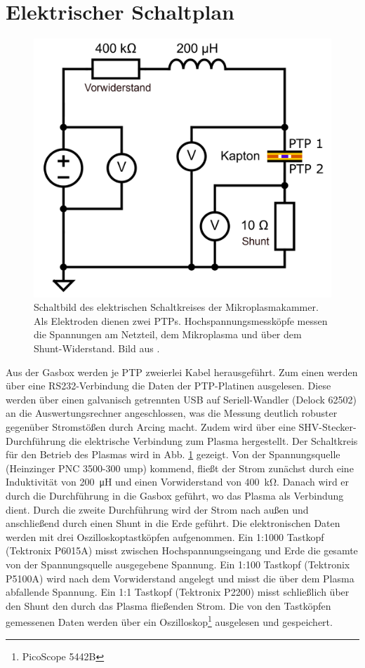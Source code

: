\section{Elektrischer Schaltplan}

\begin{figure}[h]
	\centering
	\includegraphics[width=0.5\linewidth]{bilder/schaltbild_beschriftet.png}
	\caption{Schaltbild des elektrischen Schaltkreises der Mikroplasmakammer. Als Elektroden dienen zwei PTPs. Hochspannungsmessköpfe messen die Spannungen am Netzteil, dem Mikroplasma und über dem Shunt-Widerstand. Bild aus \cite{hansenConventionalNonconventionalDiagnostics2022}.}
	\label{fig:schaltbild}
\end{figure}


Aus der Gasbox werden je PTP zweierlei Kabel herausgeführt. Zum einen werden über eine RS232-Verbindung die Daten der PTP-Platinen ausgelesen. Diese werden über einen galvanisch getrennten USB auf Seriell-Wandler (Delock 62502) an die Auswertungsrechner angeschlossen, was die Messung deutlich robuster gegenüber Stromstößen durch Arcing macht. Zudem wird über eine SHV-Stecker-Durchführung die elektrische Verbindung zum Plasma hergestellt. Der Schaltkreis für den Betrieb des Plasmas wird in Abb. \ref{fig:schaltbild} gezeigt. Von der Spannungsquelle (Heinzinger PNC 3500-300 ump) kommend, fließt der Strom zunächst durch eine Induktivität von \qty{200}{\micro\henry} und einen Vorwiderstand von \qty{400}{\kilo\ohm}. Danach wird er durch die Durchführung in die Gasbox geführt, wo das Plasma als Verbindung dient. Durch die zweite Durchführung wird der Strom nach außen und anschließend durch einen Shunt in die Erde geführt. Die elektronischen Daten werden mit drei Oszilloskoptastköpfen aufgenommen. Ein 1:1000 Tastkopf (Tektronix P6015A) misst zwischen Hochspannungseingang und Erde die gesamte von der Spannungsquelle ausgegebene Spannung. Ein 1:100 Tastkopf (Tektronix P5100A) wird nach dem Vorwiderstand angelegt und misst die über dem Plasma abfallende Spannung. Ein 1:1 Tastkopf (Tektronix P2200) misst schließlich über den Shunt den durch das Plasma fließenden Strom. Die von den Tastköpfen gemessenen Daten werden über ein Oszilloskop\footnote{PicoScope 5442B} ausgelesen und gespeichert.

